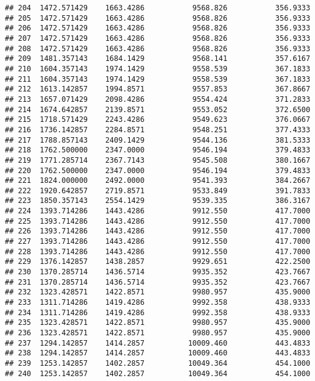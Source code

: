 \documentclass[]{article}
\begin{document}
\begin{verbatim}
## 204  1472.571429    1663.4286           9568.826           356.9333
## 205  1472.571429    1663.4286           9568.826           356.9333
## 206  1472.571429    1663.4286           9568.826           356.9333
## 207  1472.571429    1663.4286           9568.826           356.9333
## 208  1472.571429    1663.4286           9568.826           356.9333
## 209  1481.357143    1684.1429           9568.141           357.6167
## 210  1604.357143    1974.1429           9558.539           367.1833
## 211  1604.357143    1974.1429           9558.539           367.1833
## 212  1613.142857    1994.8571           9557.853           367.8667
## 213  1657.071429    2098.4286           9554.424           371.2833
## 214  1674.642857    2139.8571           9553.052           372.6500
## 215  1718.571429    2243.4286           9549.623           376.0667
## 216  1736.142857    2284.8571           9548.251           377.4333
## 217  1788.857143    2409.1429           9544.136           381.5333
## 218  1762.500000    2347.0000           9546.194           379.4833
## 219  1771.285714    2367.7143           9545.508           380.1667
## 220  1762.500000    2347.0000           9546.194           379.4833
## 221  1824.000000    2492.0000           9541.393           384.2667
## 222  1920.642857    2719.8571           9533.849           391.7833
## 223  1850.357143    2554.1429           9539.335           386.3167
## 224  1393.714286    1443.4286           9912.550           417.7000
## 225  1393.714286    1443.4286           9912.550           417.7000
## 226  1393.714286    1443.4286           9912.550           417.7000
## 227  1393.714286    1443.4286           9912.550           417.7000
## 228  1393.714286    1443.4286           9912.550           417.7000
## 229  1376.142857    1438.2857           9929.651           422.2500
## 230  1370.285714    1436.5714           9935.352           423.7667
## 231  1370.285714    1436.5714           9935.352           423.7667
## 232  1323.428571    1422.8571           9980.957           435.9000
## 233  1311.714286    1419.4286           9992.358           438.9333
## 234  1311.714286    1419.4286           9992.358           438.9333
## 235  1323.428571    1422.8571           9980.957           435.9000
## 236  1323.428571    1422.8571           9980.957           435.9000
## 237  1294.142857    1414.2857          10009.460           443.4833
## 238  1294.142857    1414.2857          10009.460           443.4833
## 239  1253.142857    1402.2857          10049.364           454.1000
## 240  1253.142857    1402.2857          10049.364           454.1000

\end{verbatim}
\end{document}
